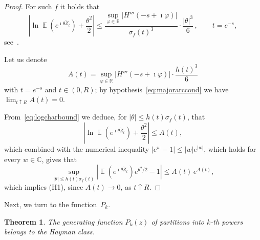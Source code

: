 \documentclass[12pt]{amsart}
\newtheorem{theorem}{Theorem}
\theoremstyle{definition}
\DeclareMathOperator{\E}{\mathbb{E}}
\begin{document}
\begin{proof}
For such $f$ it holds that
\begin{equation}\label{eq:logcharbound}
\left|\ln \E\!\left(e^{\imath\theta\breve{Z}_t}\right) + \frac{\theta^2}{2}\right| \le \frac{\sup_{\varphi\in\mathbb{R}} |H'''(-s+\imath\varphi)|}{\sigma_f(t)^3} \cdot \frac{|\theta|^3}{6}\,, \qquad t=e^{-s},
\end{equation}
see~\cite[Theorem~3.2 and~(4.3)]{CFMK}.

Let us denote
\[
A(t) = \sup_{\varphi\in\mathbb{R}} |H'''(-s+\imath\varphi)| \cdot \frac{h(t)^3}{6}
\]
with $t=e^{-s}$ and $t\in(0,R)$; by hypothesis~\eqref{eq:majorarccond} we have $\lim_{t\uparrow R}A(t)=0$.
\smallskip

From~\eqref{eq:logcharbound} we deduce, for $|\theta|\le h(t)\sigma_f(t)$, that
\[
\left|\ln \E\!\left(e^{\imath \theta\breve{Z}_t}\right) + \frac{\theta^2}{2}\right| \le A(t),
\]
which combined with the numerical inequality $|e^w-1|\le |w|e^{|w|}$, which holds for every
$w\in\mathbb{C}$, gives that
\[
\sup_{|\theta|\le h(t)\sigma_f(t)} \left|\E\!\left(e^{\imath \theta\breve{Z}_t}\right) e^{\theta^2/2} - 1\right| \le A(t)\, e^{A(t)},
\]
which implies (H1), since $A(t)\to 0$, as $t\uparrow R$.
\end{proof}

Next, we turn to the function~$P_k$.

\begin{theorem}\label{thm:Hayman}
The generating function $P_k(z)$ of partitions into $k$-th powers belongs to
the Hayman class.
\end{theorem}
\end{document}
